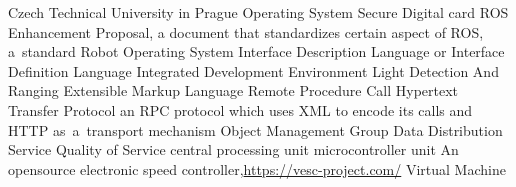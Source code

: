      {Czech Technical University in Prague}
      {Operating System}
 {Secure Digital card}
     {ROS Enhancement Proposal, a document that standardizes certain aspect of ROS, a~standard}
     {Robot Operating System}
     {Interface Description Language or Interface Definition Language}
     {Integrated Development Environment}
   {Light Detection And Ranging}
     {Extensible Markup Language}
     {Remote Procedure Call}
    {Hypertext Transfer Protocol}
 {an RPC protocol which uses XML to encode its calls and HTTP as~a~transport mechanism}
     {Object Management Group}
     {Data Distribution Service}
     {Quality of Service}
     {central processing unit}
     {microcontroller unit}
    {An opensource electronic speed controller,\nl\url{https://vesc-project.com/}}
      {Virtual Machine}

